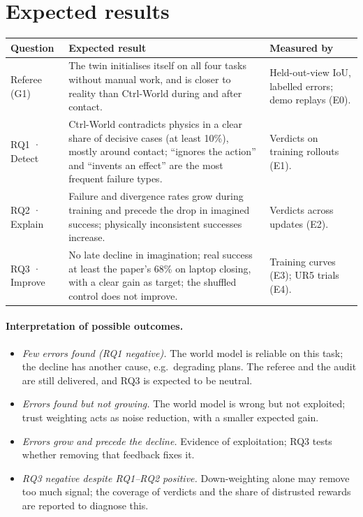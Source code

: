 \section{Expected results}\label{method:sec:expected}
\begin{center}\small
\begin{tabularx}{\linewidth}{@{}>{\raggedright\arraybackslash}p{2.6cm}>{\raggedright\arraybackslash}X>{\raggedright\arraybackslash}p{4.4cm}@{}}
\toprule
\textbf{Question} & \textbf{Expected result} & \textbf{Measured by}\\
\midrule
Referee (G1) & The twin initialises itself on all four tasks without manual work, and is closer to reality than Ctrl-World during and after contact. & Held-out-view IoU, labelled errors; demo replays (E0).\\
RQ1 · Detect & Ctrl-World contradicts physics in a clear share of decisive cases (at least 10\%), mostly around contact; ``ignores the action'' and ``invents an effect'' are the most frequent failure types. & Verdicts on training rollouts (E1).\\
RQ2 · Explain & Failure and divergence rates grow during training and precede the drop in imagined success; physically inconsistent successes increase. & Verdicts across updates (E2).\\
RQ3 · Improve & No late decline in imagination; real success at least the paper's 68\% on laptop closing, with a clear gain as target; the shuffled control does not improve. & Training curves (E3); UR5 trials (E4).\\
\bottomrule
\end{tabularx}
\end{center}

\paragraph{Interpretation of possible outcomes.}
\begin{itemize}
\item \emph{Few errors found (RQ1 negative).} The world model is reliable on this task; the decline has another cause, e.g.\ degrading plans. The referee and the audit are still delivered, and RQ3 is expected to be neutral.
\item \emph{Errors found but not growing.} The world model is wrong but not exploited; trust weighting acts as noise reduction, with a smaller expected gain.
\item \emph{Errors grow and precede the decline.} Evidence of exploitation; RQ3 tests whether removing that feedback fixes it.
\item \emph{RQ3 negative despite RQ1--RQ2 positive.} Down-weighting alone may remove too much signal; the coverage of verdicts and the share of distrusted rewards are reported to diagnose this.
\end{itemize}

